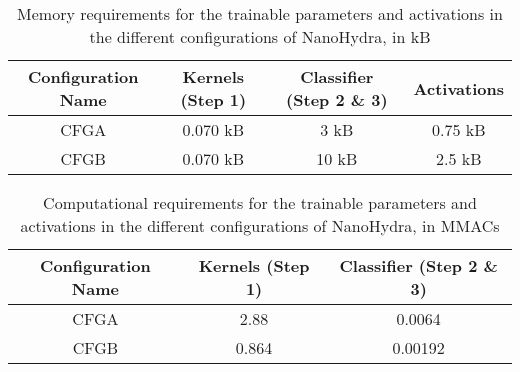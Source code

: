 \begin{table}[p!]
    \centerfloat
    \begin{tabular}{ c c c c }
    \toprule
    \textbf{Configuration Name} & Kernels (Step 1) & Classifier (Step 2 \& 3) & Activations \\
    \midrule
    CFGA & 0.070 kB &  3 kB & 0.75 kB \\
    CFGB & 0.070 kB & 10 kB & 2.5  kB \\
    \bottomrule
    \end{tabular}
    \caption{Memory requirements for the trainable parameters and activations in the different configurations of NanoHydra, in kB}%
    \label{tbl:gap9_test_cfg_reqmem}
\end{table}

\begin{table}[p!]
    \centerfloat
    \begin{tabular}{ c c c }
    \toprule
    \textbf{Configuration Name} & Kernels (Step 1) & Classifier (Step 2 \& 3)\\
    \midrule
    CFGA & 2.88  & 0.0064 \\
    CFGB & 0.864 & 0.00192 \\
    \bottomrule
    \end{tabular}
    \caption{Computational requirements for the trainable parameters and activations in the different configurations of NanoHydra, in MMACs}%
    \label{tbl:gap9_test_cfg_reqcomp}
\end{table}

